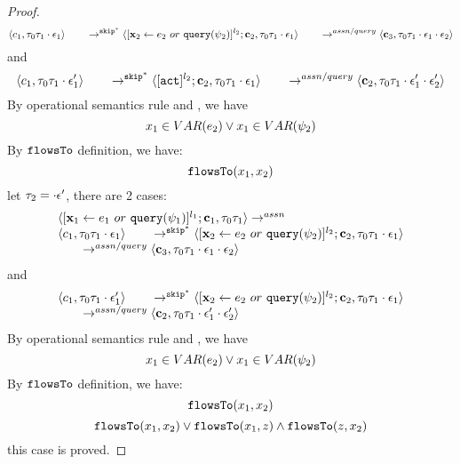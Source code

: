 \begin{proof}
\[\\ 
 \langle c_1, \mathtt{\tau}_0 \mathtt{\tau}_1 \cdot \mathtt{\epsilon}_1 \rangle 
  \qquad \rightarrow^{\mathtt{skip}^*} 
  \langle [\mathrel{ {\boldsymbol{\mathbf{x}}}_2 \leftarrow e_2 ~ or ~ {\tt query}(\psi_2) }]^{l_2};{\boldsymbol{\mathbf{c}}}_2, 
  \mathtt{\tau}_0 \mathtt{\tau}_1 \cdot \mathtt{\epsilon}_1 \rangle 
  \\
  \qquad \rightarrow^{assn/query} 
  \langle {\boldsymbol{\mathbf{c}}}_3,  \mathtt{\tau}_0 \mathtt{\tau}_1 \cdot \mathtt{\epsilon}_1\cdot \mathtt{\epsilon}_2 \rangle 
\]
and
\[
   \langle c_1, \mathtt{\tau}_0 \mathtt{\tau}_1 \cdot \mathtt{\epsilon}_1' \rangle 
  \qquad \rightarrow^{\mathtt{skip}^*} 
  \langle [\mathtt{act}]^{l_2} ; {\boldsymbol{\mathbf{c}}}_2, \mathtt{\tau}_0 \mathtt{\tau}_1 \cdot \mathtt{\epsilon}_1 \rangle 
  \\
  \qquad \rightarrow^{assn/query} 
  \langle {\boldsymbol{\mathbf{c}}}_2,  \mathtt{\tau}_0 \mathtt{\tau}_1 \cdot \mathtt{\epsilon}_1' \cdot \mathtt{\epsilon}_2' \rangle 
\]
By operational semantics rule  and , we have 
\[
  x_1 \in VAR(e_2) \lor x_1 \in VAR(\psi_2)
\]
By $\mathtt{flowsTo}$ definition, we have:
\[
\mathtt{flowsTo}(x_1, x_2)
\]
%
 let $\mathtt{\tau}_2 = \cdot \mathtt{\epsilon}'$, there are 2 cases:
\[
\begin{array}{l}
  \langle [\mathrel{ {\boldsymbol{\mathbf{x}}}_1 \leftarrow e_1~ or ~ {\tt query}(\psi_1) }]^{l_1} ; {\boldsymbol{\mathbf{c}}}_1, \mathtt{\tau}_0 \mathtt{\tau}_1 \rangle  \rightarrow^{assn}
\\ 
 \langle c_1, \mathtt{\tau}_0 \mathtt{\tau}_1 \cdot \mathtt{\epsilon}_1 \rangle 
  \qquad \rightarrow^{\mathtt{skip}^*} 
  \langle [\mathrel{ {\boldsymbol{\mathbf{x}}}_2 \leftarrow e_2 ~ or ~ {\tt query}(\psi_2) }]^{l_2};{\boldsymbol{\mathbf{c}}}_2, 
  \mathtt{\tau}_0 \mathtt{\tau}_1 \cdot \mathtt{\epsilon}_1 \rangle 
  \\
  \qquad \rightarrow^{assn/query} 
  \langle {\boldsymbol{\mathbf{c}}}_3,  \mathtt{\tau}_0 \mathtt{\tau}_1 \cdot \mathtt{\epsilon}_1\cdot \mathtt{\epsilon}_2 \rangle 
\end{array}
\]
and
\[
\begin{array}{l}
\langle c_1, \mathtt{\tau}_0 \mathtt{\tau}_1 \cdot \mathtt{\epsilon}_1' \rangle 
  \qquad \rightarrow^{\mathtt{skip}^*} 
  \langle [\mathrel{ {\boldsymbol{\mathbf{x}}}_2 \leftarrow e_2 ~ or ~ {\tt query}(\psi_2) }]^{l_2} ; {\boldsymbol{\mathbf{c}}}_2, \mathtt{\tau}_0 \mathtt{\tau}_1 \cdot \mathtt{\epsilon}_1 \rangle 
  \\
  \qquad \rightarrow^{assn/query} 
  \langle {\boldsymbol{\mathbf{c}}}_2,  \mathtt{\tau}_0 \mathtt{\tau}_1 \cdot \mathtt{\epsilon}_1' \cdot \mathtt{\epsilon}_2' \rangle
\end{array} 
\]
By operational semantics rule  and , we have 
\[
  x_1 \in VAR(e_2) \lor x_1 \in VAR(\psi_2)
\]
By $\mathtt{flowsTo}$ definition, we have:
\[
\mathtt{flowsTo}(x_1, x_2)
\]
\[
  \mathtt{flowsTo}(x_1, x_2) \lor \mathtt{flowsTo}(x_1, z) \land \mathtt{flowsTo}(z, x_2)
\]
this case is proved.


\end{proof}
